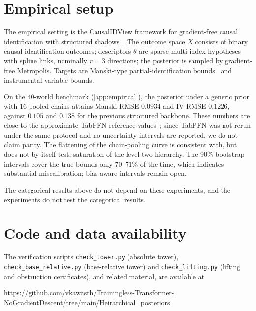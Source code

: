 \documentclass[11pt]{article}
\theoremstyle{definition}
\theoremstyle{remark}
\begin{document}
\section{Empirical setup}

The empirical setting is the CausalIDView framework for gradient-free causal identification with
structured shadows~\cite{Awasthi-CausalIDView}. The outcome space $X$ consists of binary causal
identification outcomes; descriptors $\theta$ are sparse multi-index hypotheses with spline links,
nominally $r=3$ directions; the posterior is sampled by gradient-free Metropolis. Targets are
Manski-type partial-identification bounds~\cite{Manski1990} and instrumental-variable bounds.

On the 40-world benchmark (\cref{app:empirical}), the posterior under a generic prior with 16 pooled
chains attains Manski RMSE $0.0934$ and IV RMSE $0.1226$, against $0.105$ and $0.138$ for the
previous structured backbone. These numbers are close to the approximate TabPFN reference
values~\cite{Hollmann2023}; since TabPFN was not rerun under the same protocol and no uncertainty
intervals are reported, we do not claim parity. The flattening of the chain-pooling curve is
consistent with, but does not by itself test, saturation of the level-two hierarchy. The 90\%
bootstrap intervals cover the true bounds only 70--71\% of the time, which indicates substantial
miscalibration; bias-aware intervals remain open.

The categorical results above do not depend on these experiments, and the experiments do not test
the categorical results.

\section{Code and data availability}

The verification scripts \texttt{check\_tower.py} (absolute tower),
\texttt{check\_base\_relative.py} (base-relative tower) and \texttt{check\_lifting.py} (lifting and
obstruction certificates), and related material, are available at
\begin{center}\small\url{https://github.com/vkawasth/Trainingless-Transformer-NoGradientDescent/tree/main/Heirarchical_posteriors}\end{center}
\end{document}
